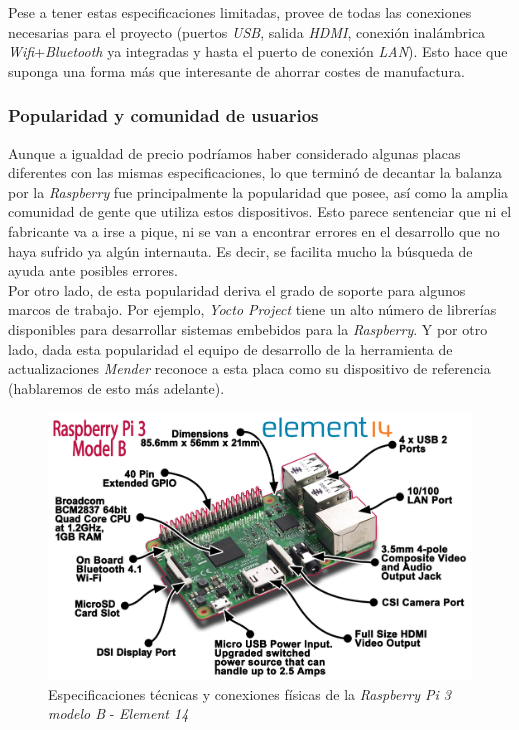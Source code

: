 Pese a tener estas especificaciones limitadas, provee de todas las conexiones necesarias para el proyecto (puertos \textit{USB}, salida \textit{HDMI}, conexión inalámbrica \textit{Wifi}+\textit{Bluetooth} ya integradas y hasta el puerto de conexión \textit{LAN}). Esto hace que suponga una forma más que interesante de ahorrar costes de manufactura.\\

\subsubsection{Popularidad y comunidad de usuarios}

Aunque a igualdad de precio podríamos haber considerado algunas placas diferentes con las mismas especificaciones, lo que terminó de decantar la balanza por la \textit{Raspberry} fue principalmente la popularidad que posee, así como la amplia comunidad de gente que utiliza estos dispositivos. Esto parece sentenciar que ni el fabricante va a irse a pique, ni se van a encontrar errores en el desarrollo que no haya sufrido ya algún internauta. Es decir, se facilita mucho la búsqueda de ayuda ante posibles errores.\\

Por otro lado, de esta popularidad deriva el grado de soporte para algunos marcos de trabajo. Por ejemplo, \textit{Yocto Project} tiene un alto número de librerías disponibles para desarrollar sistemas embebidos para la \textit{Raspberry}. Y por otro lado, dada esta popularidad el equipo de desarrollo de la herramienta de actualizaciones \textit{Mender} reconoce a esta placa como su dispositivo de referencia \cite{mender-raspberry-pi} (hablaremos de esto más adelante).

\begin{figure}[H]
	\centering
	\includegraphics[width=0.9\linewidth]{imagenes/Pi3+Breakout+Feb+29+2016.png}
	\caption{Especificaciones técnicas y conexiones físicas de la \textit{Raspberry Pi 3 modelo B} - \textit{Element 14} \cite{raspberry-pi-3-model-b-specs}}
	\label{rpi3-b-specs}
\end{figure}

